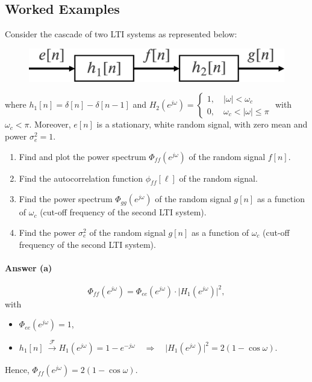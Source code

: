 \subsection{Worked Examples}
\begin{q}{}
Consider the cascade of two LTI systems as represented below:
\begin{figure}[H]
    \centering
    \includegraphics[width=.5\textwidth]{images/random_proc_ex.eps}
\end{figure}
where $h_1[n] = \delta[n] - \delta[n-1]$ and $\displaystyle H_2(e^{j\omega}) = \begin{cases}
1, \quad \lvert \omega \rvert < \omega_c \\
0, \quad \omega_c < \lvert \omega \rvert \leq \pi
\end{cases}
$ with $\omega_{c} < \pi$. Moreover, $e[n]$ is a stationary, white random signal, with zero mean and power $\sigma_{e}^2 = 1$.

\begin{enumerate}[label=(\alph*)]
    \item Find and plot the power spectrum $\Phi_{ff}(e^{j\omega})$ of the random signal $f[n]$.

    \item Find the autocorrelation function $\phi_{ff}[\ell]$ of the random signal.

    \item Find the power spectrum $\Phi_{gg}(e^{j\omega})$ of the random signal $g[n]$ as a function of $\omega_c$ (cut-off frequency of the second LTI system).

    \item Find the power $\sigma_{e}^{2}$ of the random signal $g[n]$ as a function of $\omega_c$ (cut-off frequency of the second LTI system).
\end{enumerate}

{\color{blue}

\paragraph{Answer (a)}
\[
    \Phi_{ff}(e^{j\omega}) = \Phi_{ee}(e^{j\omega}) \cdot \lvert H_1(e^{j\omega})\rvert^2,
\]
with
\begin{itemize}
    \item $\Phi_{ee}(e^{j\omega}) = 1$, 
    \item $h_1[n] \ \xrightarrow[]{\mathcal{F}}H_1(e^{j\omega}) = 1 - e^{-j\omega} \quad \Rightarrow \quad \lvert H_1(e^{j\omega})\rvert^2 = 2 (1 - \cos\omega)$.
\end{itemize}
Hence, $\Phi_{ff}(e^{j\omega}) = 2 (1 - \cos\omega)$.

}
\end{q}
